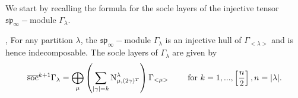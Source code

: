 \documentclass[main.tex]{subfiles}
\begin{document}
We start by recalling the formula for the socle layers of the injective tensor $\mathfrak{sp}_\infty-$module $\Gamma_\lambda$.
\begin{thm}{\cite{penkov2007tensorrepresentationsclassicallocally}, \cite{dancohen2012koszulcategoryrepresentationsfinitary}}
\label{thm-soc}
    For any partition $\lambda$, the $\mathfrak{sp}_\infty-$module $\Gamma_\lambda$ is an injective hull of $\Gamma_{<\lambda>}$ and is hence indecomposable. The socle layers of $\Gamma_\lambda$ are given by
    $$
    \overline{\text{soc}}^{k+1}\Gamma_\lambda = \bigoplus\limits_{\mu} \left( \sum\limits_{|\gamma|=k} \text{N}^{\lambda}_{\mu, (2\gamma)^T} \right) \Gamma_{<\mu>}
    \hspace{0.7cm} \text{ for } k = 1, ..., \left[\frac{n}{2}\right], n = |\lambda|.$$
\end{thm}
\bigskip
\end{document}
